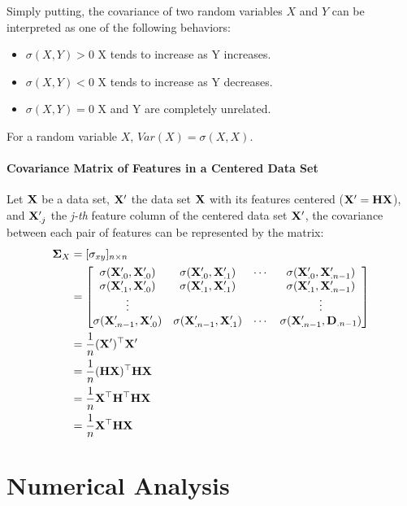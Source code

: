 Simply putting, the covariance of two random variables $X$ and $Y$ can be interpreted as one of the following behaviors:
\begin{itemize}
	\item $\sigma(X,Y) > 0$ X tends to increase as Y increases.
	\item $\sigma(X,Y) < 0$ X tends to increase as Y decreases.
	\item $\sigma(X,Y) = 0$ X and Y are completely unrelated.
\end{itemize}

\begin{remark}
	For a random variable $X$, $Var(X) = \sigma(X, X)$.
\end{remark}

\paragraph{Covariance Matrix of Features in a Centered Data Set}

Let $\mathbf{X}$ be a data set, $\mathbf{X}'$ the data set $\mathbf{X}$ with its features centered ($\mathbf{X}'=\mathbf{H} \mathbf{X}$), and $\mathbf{X}'_{.j}$ the {\em j-th} feature column of the centered data set $\mathbf{X}'$, the covariance between each pair of features can be represented by the matrix:
\begin{align*}
\mathbf{\Sigma}_X &= [\mathbf{\sigma}_{xy}]_{n \times n} \\
&= \begin{bmatrix}
\sigma(\mathbf{X}'_{.0}, \mathbf{X}'_{.0}) & \sigma(\mathbf{X}'_{.0}, \mathbf{X}'_{.1}) & \cdots & \sigma(\mathbf{X}'_{.0}, \mathbf{X}'_{.n-1}) \\
\sigma(\mathbf{X}'_{.1}, \mathbf{X}'_{.0}) & \sigma(\mathbf{X}'_{.1}, \mathbf{X}'_{.1}) & & \sigma(\mathbf{X}'_{.1}, \mathbf{X}'_{.n-1}) \\
\vdots &&& \vdots \\
\sigma(\mathbf{X}'_{.n-1}, \mathbf{X}'_{.0}) & \sigma(\mathbf{X}'_{.n-1}, \mathbf{X}'_{.1}) & \cdots & \sigma(\mathbf{X}'_{.n-1}, \mathbf{D}_{.n-1})
\end{bmatrix} \\
&= \frac{1}{n} (\mathbf{X}')^\top \mathbf{X}' \\
&= \frac{1}{n} (\mathbf{HX})^\top \mathbf{HX} \\
&= \frac{1}{n} \mathbf{X}^\top \mathbf{H}^\top \mathbf{HX} \\
 &= \frac{1}{n} \mathbf{X}^\top \mathbf{HX}
\end{align*}

\section{Numerical Analysis}
